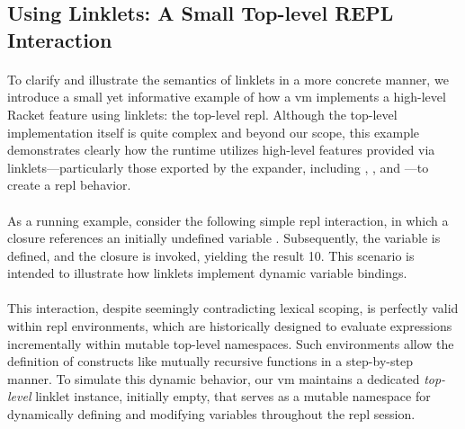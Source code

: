 		\subsection{Using Linklets: A Small Top-level REPL Interaction}
		\label{subsec:toplevel-example}

		\paragraph{}%
			To clarify and illustrate the semantics of linklets in a more concrete manner, we introduce a small yet informative example of how a \gls{vm} implements a high-level Racket feature using linklets: the top-level \gls{repl}. Although the top-level implementation itself is quite complex and beyond our scope, this example demonstrates clearly how the runtime utilizes high-level features provided via linklets—particularly those exported by the expander, including , , and —to create a \gls{repl} behavior.

		\paragraph{}%
			As a running example, consider the following simple \gls{repl} interaction, in which a closure  references an initially undefined variable . Subsequently, the variable  is defined, and the closure is invoked, yielding the result 10. This scenario is intended to illustrate how linklets implement dynamic variable bindings.


		\paragraph{}%
			This interaction, despite seemingly contradicting lexical scoping, is perfectly valid within \gls{repl} environments, which are historically designed to evaluate expressions incrementally within mutable top-level namespaces. Such environments allow the definition of constructs like mutually recursive functions in a step-by-step manner. To simulate this dynamic behavior, our \gls{vm} maintains a dedicated \emph{top-level} linklet instance, initially empty, that serves as a mutable namespace for dynamically defining and modifying variables throughout the \gls{repl} session.

